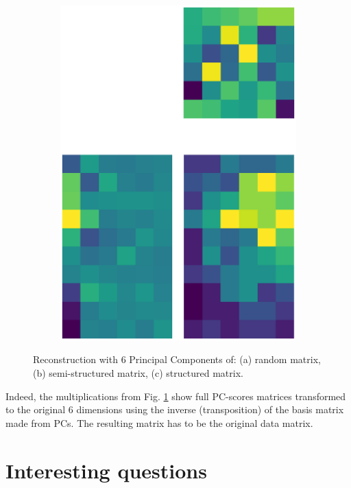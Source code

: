 \documentclass[10pt,twocolumn]{article}
\begin{document}
\begin{figure}[H]
\begin{subfigure}[t]{.15\textwidth}
\includegraphics[scale=.2]{DWGs/structured-matrix-reconstruction-PCs-6.eps}
\caption{ }
\end{subfigure}
\caption{Reconstruction with 6 Principal Components of: (a) random matrix, (b) semi-structured matrix, (c) structured matrix.}
\label{fig:matrices-reconstruction-6}
\end{figure}

Indeed, the multiplications from Fig. \ref{fig:matrices-reconstruction-6} show full PC-scores matrices transformed to the original 6 dimensions using the inverse (transposition) of the basis matrix made from PCs. The resulting matrix has to be the original data matrix.


\newpage


\section{Interesting questions}
\end{document}
